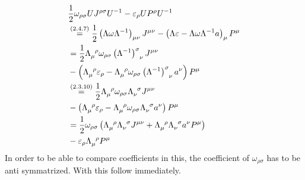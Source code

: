 \subsubsection{ }\label{sususec:2_4_p60_1}
\begin{align*} 
	&\dfrac{1}{2}\omega_{\rho\sigma} U J^{\rho\sigma} U^{-1}-\varepsilon_\rho U P^\rho U^{-1}\\
	&\overset{({2.4.7})}{=}\dfrac{1}{2}\left(\Lambda\omega\Lambda^{-1}\right)_{\mu\nu}J^{\mu\nu}-\left(\Lambda \varepsilon-\Lambda\omega\Lambda^{-1}a\right)_\mu P^\mu\\
	&=\dfrac{1}{2}\Lambda_\mu^{\hphantom{\mu}\rho}\omega_{\rho \sigma}\left(\Lambda^{-1}\right)^\sigma_{\hphantom{\sigma}\nu}J^{\mu\nu}\\
	&-\left(\Lambda_\mu^{\hphantom{\mu}\rho} \varepsilon_\rho-\Lambda_\mu^{\hphantom{\mu}\rho}\omega_{\rho \sigma}\left(\Lambda^{-1}\right)^\sigma_{\hphantom{\sigma}\nu}a^\nu\right) P^\mu\\
	&\overset{({2.3.10})}{=}\dfrac{1}{2}\Lambda_\mu^{\hphantom{\mu}\rho}\omega_{\rho \sigma}\Lambda^{\hphantom{\nu}\sigma}_{\nu}J^{\mu\nu}\\
	&-\left(\Lambda_\mu^{\hphantom{\mu}\rho} \varepsilon_\rho-\Lambda_\mu^{\hphantom{\mu}\rho}\omega_{\rho \sigma}\Lambda^{\hphantom{\nu}\sigma}_{\nu}a^\nu\right) P^\mu\\
	&=\dfrac{1}{2}\omega_{\rho \sigma}\left(\Lambda_\mu^{\hphantom{\mu}\rho}\Lambda^{\hphantom{\nu}\sigma}_{\nu}J^{\mu\nu}+\Lambda_\mu^{\hphantom{\mu}\rho}\Lambda^{\hphantom{\nu}\sigma}_{\nu}a^\nu P^\mu\right)\\
	&-\varepsilon_\rho \Lambda_\mu^{\hphantom{\mu}\rho}P^\mu
\end{align*}
In order to be able to compare coefficients in this, the coefficient of $\omega_{\rho \sigma}$ has to be anti symmatrized. With this  follow immediately.

